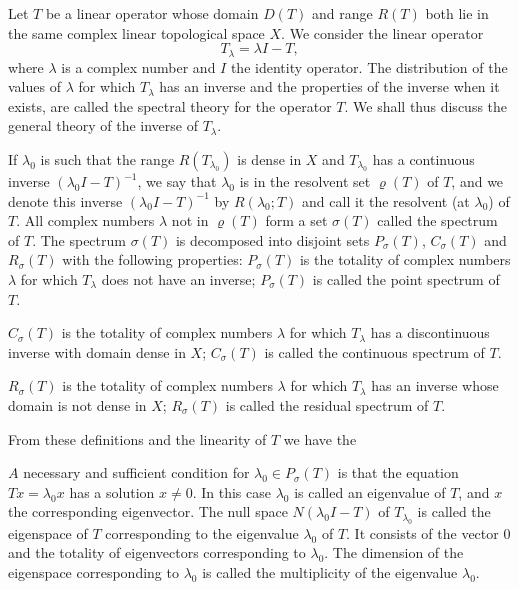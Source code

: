 \label{chap:VIII}

Let $T$ be a linear operator whose domain $D(T)$ and range $R(T)$ both lie in the same complex linear topological space $X$. We consider the linear operator 
\[
T _{\lambda} = \lambda I - T,
\]
where $\lambda$ is a complex number and $I$ the identity operator. The distribution of the values of $\lambda$ for which $T_{\lambda}$ has an inverse and the properties of the inverse when it exists, are called the spectral theory for the operator $T$. We shall thus discuss the general theory of the inverse of $T_{\lambda}$. 


\label{sec:VIII.1}

\begin{definitionu} If $\lambda_0$ is such that the range $R(T_{\lambda_0})$ is dense in $X$ and $T_{\lambda_0}$ has a continuous inverse $(\lambda_0I - T)^{-1}$, we say that $\lambda_0$ is in the resolvent set $\varrho(T)$ of $T$, and we denote this inverse $(\lambda_0I - T)^{-1}$ by $R(\lambda_0; T)$ and call it the resolvent (at $\lambda_0$) of $T$. All complex numbers $\lambda$ not in $\varrho(T)$ form a set $\sigma(T)$ called the spectrum of $T$. The spectrum $\sigma(T)$ is decomposed into disjoint sets $P_{\sigma}(T)$, $C_{\sigma}(T)$ and $R_{\sigma}(T)$ with the following properties: $P_{\sigma}(T)$ is the totality of complex numbers $\lambda$ for which $T_{\lambda}$ does not have an inverse; $P_{\sigma}(T)$ is called the point spectrum of $T$. 

$C_{\sigma}(T)$ is the totality of complex numbers $\lambda$ for which $T_{\lambda}$ has a discontinuous inverse with domain dense in $X$; $C_{\sigma}(T)$ is called the continuous spectrum of $T$. 

$R_{\sigma}(T)$ is the totality of complex numbers $\lambda$ for which $T_{\lambda}$ has an inverse whose domain is not dense in $X$; $R_{\sigma}(T)$ is called the residual spectrum of $T$. 
\end{definitionu}

From these definitions and the linearity of $T$ we have the 

\begin{propositionu} $A$ necessary and sufficient condition for $\lambda_{0}\in P_{\sigma}(T)$ is that the equation $Tx=\lambda_{0}x$ has a solution $x\neq0$. In this case $\lambda_{0}$ is called an eigenvalue of $T$, and $x$ the corresponding eigenvector. The null space $N(\lambda_{0}I-T)$ of $T_{\lambda_{0}}$ is called the eigenspace of $T$ corresponding to the eigenvalue $\lambda_{0}$ of $T$. It consists of the vector $0$ and the totality of eigenvectors corresponding to $\lambda_{0}$. The dimension of the eigenspace corresponding to $\lambda_{0}$ is called the multiplicity of the eigenvalue $\lambda_{0}$. 
\end{propositionu}


